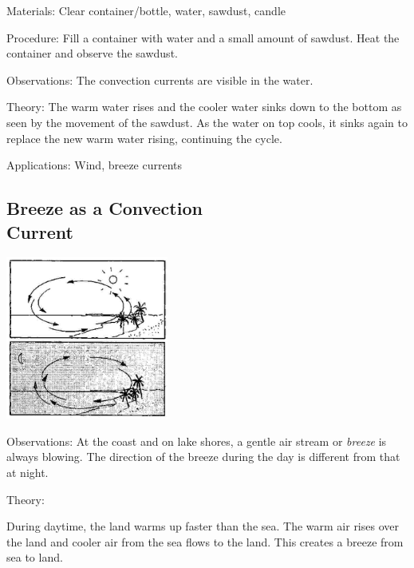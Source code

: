 \begin{multicols}{2}
\begin{description*}
\item[Materials:]{Clear container/bottle, water, sawdust, candle}
\item[Procedure:]{Fill a container with water and a small amount of sawdust. Heat the container and observe the sawdust.}
\item[Observations:]{The convection currents are visible in the water.}
\item[Theory:]{The warm water rises and the cooler water sinks down to the bottom as seen by the movement of the sawdust. As the water on top cools, it sinks again to replace the new warm water rising, continuing the cycle.}
\item[Applications:]{Wind, breeze currents}
\end{description*}

\subsection[Breeze as a Convection Current]{Breeze as a Convection \hfill \\ Current}

\begin{center}
\includegraphics[width=0.4\textwidth]{./img/source/breeze-2.jpg}
\end{center}

\begin{description*}
\item[Observations:]{At the coast and on lake shores, a gentle air stream or \emph{breeze} is always blowing. The direction of the breeze during the day is different from that at night.}
\item[Theory:]{During daytime, the land warms up faster than the sea. The warm air rises over the land and cooler air from the sea flows to the land. This creates a breeze from sea to land.

}
\end{description*}
\end{multicols}
